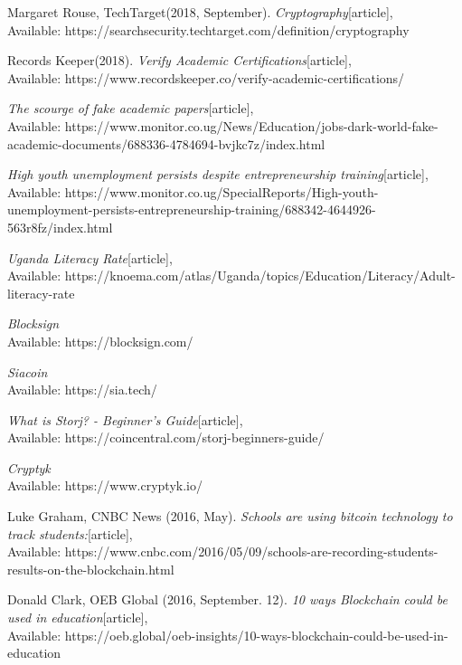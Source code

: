 \begin{thebibliography}{}

Margaret Rouse, TechTarget(2018, September).
\emph{Cryptography}[article],\\
Available: {https://searchsecurity.techtarget.com/definition/cryptography}

 Records Keeper(2018).
\emph{Verify Academic Certifications}[article],\\
Available: {https://www.recordskeeper.co/verify-academic-certifications/}

\emph{The scourge of fake academic papers}[article],\\
Available: {https://www.monitor.co.ug/News/Education/jobs-dark-world-fake-academic-documents/688336-4784694-bvjkc7z/index.html}

\emph{High youth unemployment persists despite entrepreneurship training}[article],\\
Available: {https://www.monitor.co.ug/SpecialReports/High-youth-unemployment-persists-entrepreneurship-training/688342-4644926-563r8fz/index.html}

\emph{Uganda Literacy Rate}[article],\\
Available: {https://knoema.com/atlas/Uganda/topics/Education/Literacy/Adult-literacy-rate}

\emph{Blocksign}\\
Available: {https://blocksign.com/}

\emph{Siacoin}\\
Available: {https://sia.tech/}

\emph{What is Storj? - Beginner’s Guide}[article],\\
Available: {https://coincentral.com/storj-beginners-guide/}

\emph{Cryptyk}\\
Available: {https://www.cryptyk.io/}

Luke Graham, CNBC News (2016, May).
\emph{Schools are using bitcoin technology to track students:}[article],\\
Available: {https://www.cnbc.com/2016/05/09/schools-are-recording-students-results-on-the-blockchain.html}

Donald Clark, OEB Global (2016, September. 12).
\emph{10 ways Blockchain could be used in education}[article],\\
Available: {https://oeb.global/oeb-insights/10-ways-blockchain-could-be-used-in-education}


\end{thebibliography}
